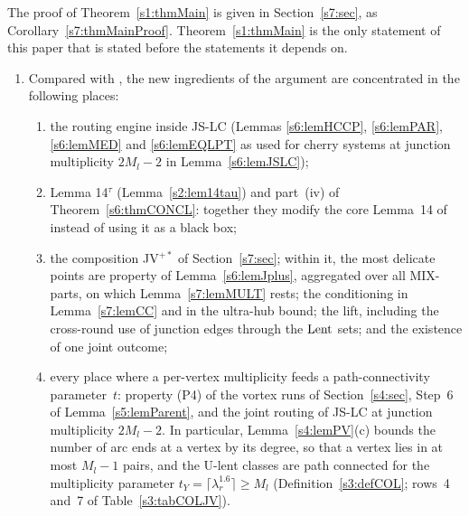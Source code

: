 The proof of Theorem~\ref{s1:thmMain} is given in Section~\ref{s7:sec}, as
Corollary~\ref{s7:thmMainProof}. Theorem~\ref{s1:thmMain} is the only statement
of this paper that is stated before the statements it depends on.

\begin{remark}\label{s1:remStatus}
\begin{enumerate}
\item[(i)] Compared with \cite{BM}, the new ingredients of the argument are
concentrated in the following places:
\begin{enumerate}
\item[(a)] the routing engine inside JS-LC (Lemmas \ref{s6:lemHCCP},
\ref{s6:lemPAR}, \ref{s6:lemMED} and \ref{s6:lemEQLPT} as used for cherry
systems at junction multiplicity $2M_l-2$ in Lemma~\ref{s6:lemJSLC});
\item[(b)] Lemma 14$^\tau$ (Lemma~\ref{s2:lem14tau}) and part~(iv) of
Theorem~\ref{s6:thmCONCL}: together they modify the core Lemma~14 of
\cite{BM} instead of using it as a black box;
\item[(c)] the composition JV$^{+*}$ of Section~\ref{s7:sec}; within it, the
most delicate points are property  of Lemma~\ref{s6:lemJplus}, aggregated
over all MIX-parts, on which Lemma~\ref{s7:lemMULT} rests; the conditioning in
Lemma~\ref{s7:lemCC} and in the ultra-hub bound; the lift, including the
cross-round use of junction edges through the $\mathrm{Lent}$ sets; and the existence of
one joint outcome;
\item[(d)] every place where a per-vertex multiplicity feeds a path-connectivity
parameter~$t$: property (P4) of the vortex runs of Section~\ref{s4:sec}, Step~6
of Lemma~\ref{s5:lemParent}, and the joint routing of JS-LC at junction
multiplicity $2M_l-2$. In particular, Lemma~\ref{s4:lemPV}(c) bounds the number
of arc ends at a vertex by its degree, so that a vertex lies in at most $M_l-1$
pairs, and the U-lent classes are path connected for the multiplicity parameter
$t_Y=\lceil\lambda_r^{1.6}\rceil\ge M_l$ (Definition~\ref{s3:defCOL}; rows~4
and~7 of Table~\ref{s3:tabCOLJV}).
\end{enumerate}


\end{enumerate}
\end{remark}

